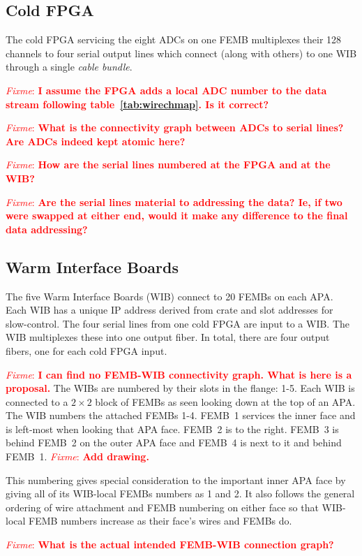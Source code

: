 \documentclass[pdftex,12pt,letter]{article}
\newcommand{\fixme}[1]{\textcolor{red}{\textit{Fixme}: \textbf{#1}}}
\begin{document}
\subsection{Cold FPGA}

The cold FPGA servicing the eight ADCs on one FEMB multiplexes their
128 channels to four serial output lines which connect (along with
others) to one WIB through a single \textit{cable bundle}.

\fixme{I assume the FPGA adds a local ADC number to the data stream following table~\ref{tab:wirechmap}.  Is it correct?}

\fixme{What is the connectivity graph between ADCs to serial lines?  Are ADCs indeed kept atomic here?}

\fixme{How are the serial lines numbered at the FPGA and at the WIB?}

\fixme{Are the serial lines material to addressing the data?  Ie, if two were swapped at either end, would it make any difference to the final data addressing?}


\subsection{Warm Interface Boards}


The five Warm Interface Boards (WIB) connect to 20 FEMBs on each APA.
Each WIB has a unique IP address derived from crate and slot addresses
for slow-control.  The four serial lines from one cold FPGA are input
to a WIB.  The WIB multiplexes these into one output fiber.  In total,
there are four output fibers, one for each cold FPGA input.

\fixme{I can find no FEMB-WIB connectivity
  graph.  What is here is a proposal.}  The WIBs are numbered by their
slots in the flange: 1-5.  Each WIB is connected to a $2\times 2$
block of FEMBs as seen looking down at the top of an APA.  The WIB
numbers the attached FEMBs 1-4.  FEMB~1 services the inner face and is
left-most when looking that APA face.  FEMB~2 is to the right.  FEMB~3
is behind FEMB~2 on the outer APA face and FEMB~4 is next to it and
behind FEMB~1.  \fixme{Add drawing.}

This numbering gives special consideration to the important inner APA
face by giving all of its WIB-local FEMBs numbers as 1 and 2.  It also
follows the general ordering of wire attachment and FEMB numbering on
either face so that WIB-local FEMB numbers increase as their face's
wires and FEMBs do.


\fixme{What is the actual intended FEMB-WIB connection graph?}
\end{document}
